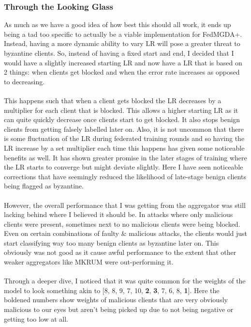\subsubsection{Through the Looking Glass}
As much as we have a good idea of how best this should all work, it ends up being a tad too specific to actually be a viable implementation for FedMGDA+.
Instead, having a more dynamic ability to vary LR will pose a greater threat to byzantine clients.
So, instead of having a fixed start and end, I decided that I would have a slightly increased starting LR and now have a LR that is based on 2 things: when clients get blocked and when the error rate increases as opposed to decreasing.
\\ \\
This happens such that when a client gets blocked the LR decreases by a multiplier for each client that is blocked.
This allows a higher starting LR as it can quite quickly decrease once clients start to get blocked.
It also stops benign clients from getting falsely labelled later on.
Also, it is not uncommon that there is some fluctuation of the LR during federated training rounds and so having the LR increase by a set multiplier each time this happens has given some noticeable benefits as well.
It has shown greater promise in the later stages of training where the LR starts to converge but might deviate slightly.
Here I have seen noticeable corrections that have seemingly reduced the likelihood of late-stage benign clients being flagged as byzantine.
\\ \\
However, the overall performance that I was getting from the aggregator was still lacking behind where I believed it should be.
In attacks where only malicious clients were present, sometimes next to no malicious clients were being blocked.
Even on certain combinations of faulty \& malicious attacks, the clients would just start classifying way too many benign clients as byzantine later on.
This obviously was not good as it cause awful performance to the extent that other weaker aggregators like MKRUM were out-performing it.
\\ \\
Through a deeper dive, I noticed that it was quite common for the weights of the model to look something akin to [8, 8, 9, 7, 10, \textbf{2}, \textbf{3}, 7, 6, 8, \textbf{1}].
Here the boldened numbers show weights of malicious clients that are very obviously malicious to our eyes but aren't being picked up due to not being negative or getting too low at all.
